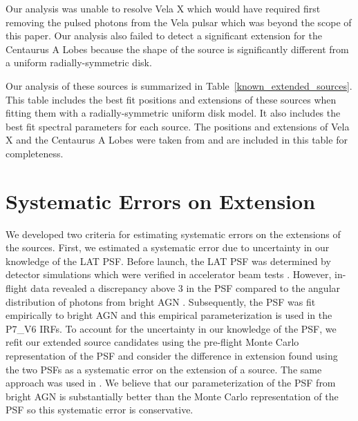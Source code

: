 \documentclass[12pt,preprint]{aastex}
\newcommand{\gev}{\text{GeV}\xspace}
\begin{document}
Our analysis was unable to resolve Vela X which would have required first
removing the pulsed photons from the Vela pulsar which was beyond the
scope of this paper.  Our analysis also failed to detect a significant
extension for the Centaurus A Lobes because
the shape of the source is significantly different from a uniform
radially-symmetric disk\citep{cen_a_lat}.

Our analysis of these sources is summarized in
Table~\ref{known_extended_sources}.  This table includes the best fit
positions and extensions of these sources when fitting them 
with a radially-symmetric uniform disk model. It also
includes the best fit spectral parameters for each source.  The positions
and extensions of Vela X and the Centaurus A Lobes were taken from
\cite{velax,cen_a_lat} and are included in this table for completeness.

\section{Systematic Errors on Extension}
\label{systematic_errors_on_extension}


We developed two criteria for estimating systematic errors
on the extensions of the sources.
First, we estimated a systematic error due to
uncertainty in our knowledge of the LAT PSF.  
Before launch, the LAT PSF
was determined by detector simulations which were verified in accelerator
beam tests \citep{atwood_LAT_mission}. However, in-flight data revealed
a discrepancy above 3 \gev in the PSF compared to the angular
distribution of photons from bright AGN \citep{lat_on_orbit_psf}.
Subsequently, the PSF was fit empirically to bright AGN and this
empirical parameterization is used in the P7\_V6 IRFs.  To account for
the uncertainty in our knowledge of the PSF, we refit our extended source
candidates using the pre-flight Monte Carlo representation of the PSF
and consider the difference in extension found using the two PSFs as a
systematic error on the extension of a source.  The same approach was used
in \cite{ic443}.  We believe that our parameterization
of the PSF from bright AGN is substantially better than the Monte Carlo
representation of the PSF so this systematic error is conservative.

\end{document}
